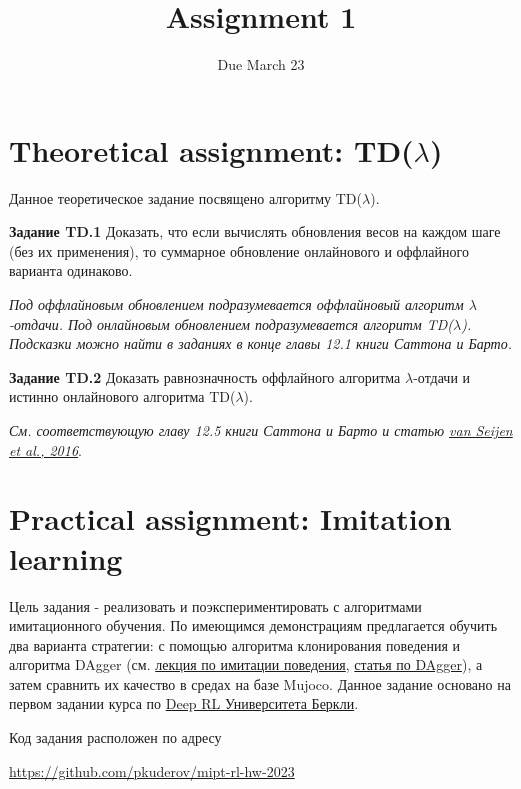 \documentclass[12pt, oneside]{article}
\author{Due March 23}
\title{Assignment 1}
\date{}
\begin{document}
\maketitle
\thispagestyle{fancy}

\section{Theoretical assignment: TD($\lambda$)}

Данное теоретическое задание посвящено алгоритму TD($\lambda$).

\textbf{Задание TD.1} Доказать, что если вычислять обновления весов на каждом шаге (без их применения), то суммарное обновление онлайнового и оффлайного варианта одинаково.

\textit{Под оффлайновым обновлением подразумевается оффлайновый алгоритм $\lambda$-отдачи. Под онлайновым обновлением подразумевается алгоритм TD($\lambda$). Подсказки можно найти в заданиях в конце главы 12.1 книги Саттона и Барто.}

\textbf{Задание TD.2} Доказать равнозначность оффлайного алгоритма $\lambda$-отдачи и истинно онлайнового алгоритма TD($\lambda$).

\textit{См. соответствующую главу 12.5 книги Саттона и Барто и статью \href{https://www.jmlr.org/papers/volume17/15-599/15-599.pdf}{van Seijen et al., 2016}}.

\section{Practical assignment: Imitation learning}

Цель задания - реализовать и поэкспериментировать с алгоритмами имитационного обучения. По имеющимся демонстрациям предлагается обучить два варианта стратегии: с помощью алгоритма клонирования поведения и алгоритма DAgger (см. \href{https://youtu.be/HUzyjOsd2PA?list=PL_iWQOsE6TfURIIhCrlt-wj9ByIVpbfGc}{лекция по имитации поведения}, \href{http://proceedings.mlr.press/v15/ross11a/ross11a.pdf}{статья по DAgger}), а затем сравнить их качество в средах на базе Mujoco. Данное задание основано на первом задании курса по \href{http://rail.eecs.berkeley.edu/deeprlcourse/}{Deep RL Университета Беркли}.

Код задания расположен по адресу
\begin{center}
    \href{https://github.com/pkuderov/mipt-rl-hw-2023}{https://github.com/pkuderov/mipt-rl-hw-2023}
\end{center}
\end{document}
